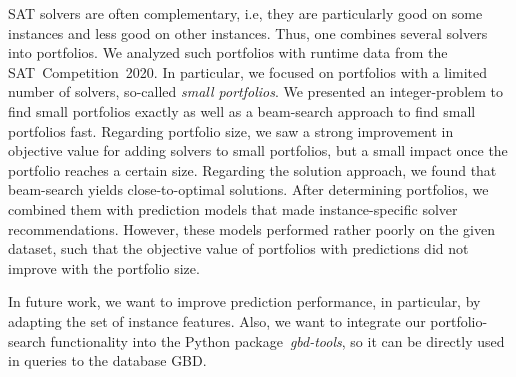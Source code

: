 \documentclass[conference]{IEEEtran}
\begin{document}
SAT solvers are often complementary, i.e, they are particularly good on some instances and less good on other instances.
Thus, one combines several solvers into portfolios.
We analyzed such portfolios with runtime data from the SAT~Competition~2020.
In particular, we focused on portfolios with a limited number of solvers, so-called \emph{small portfolios}.
We presented an integer-problem to find small portfolios exactly as well as a beam-search approach to find small portfolios fast.
Regarding portfolio size, we saw a strong improvement in objective value for adding solvers to small portfolios, but a small impact once the portfolio reaches a certain size.
Regarding the solution approach, we found that beam-search yields close-to-optimal solutions.
After determining portfolios, we combined them with prediction models that made instance-specific solver recommendations.
However, these models performed rather poorly on the given dataset, such that the objective value of portfolios with predictions did not improve with the portfolio size.

In future work, we want to improve prediction performance, in particular, by adapting the set of instance features.
Also, we want to integrate our portfolio-search functionality into the Python package~\emph{gbd-tools}, so it can be directly used in queries to the database GBD.



\end{document}
